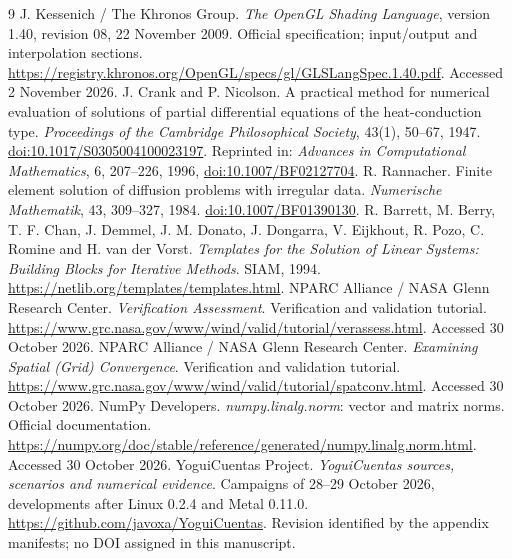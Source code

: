 \documentclass[11pt,a4paper]{article}
\newcommand{\repo}{\url{https://github.com/javoxa/YoguiCuentas}}
\begin{document}
\clearpage
\begin{thebibliography}{9}
 J. Kessenich / The Khronos Group. \emph{The OpenGL Shading Language}, version 1.40, revision 08, 22 November 2009. Official specification; input/output and interpolation sections. \url{https://registry.khronos.org/OpenGL/specs/gl/GLSLangSpec.1.40.pdf}. Accessed 2 November 2026.
 J. Crank and P. Nicolson. A practical method for numerical evaluation of solutions of partial differential equations of the heat-conduction type. \emph{Proceedings of the Cambridge Philosophical Society}, 43(1), 50--67, 1947. \href{https://doi.org/10.1017/S0305004100023197}{doi:10.1017/S0305004100023197}. Reprinted in: \emph{Advances in Computational Mathematics}, 6, 207--226, 1996, \href{https://doi.org/10.1007/BF02127704}{doi:10.1007/BF02127704}.
 R. Rannacher. Finite element solution of diffusion problems with irregular data. \emph{Numerische Mathematik}, 43, 309--327, 1984. \href{https://doi.org/10.1007/BF01390130}{doi:10.1007/BF01390130}.
 R. Barrett, M. Berry, T. F. Chan, J. Demmel, J. M. Donato, J. Dongarra, V. Eijkhout, R. Pozo, C. Romine and H. van der Vorst. \emph{Templates for the Solution of Linear Systems: Building Blocks for Iterative Methods}. SIAM, 1994. \url{https://netlib.org/templates/templates.html}.
 NPARC Alliance / NASA Glenn Research Center. \emph{Verification Assessment}. Verification and validation tutorial. \url{https://www.grc.nasa.gov/www/wind/valid/tutorial/verassess.html}. Accessed 30 October 2026.
 NPARC Alliance / NASA Glenn Research Center. \emph{Examining Spatial (Grid) Convergence}. Verification and validation tutorial. \url{https://www.grc.nasa.gov/www/wind/valid/tutorial/spatconv.html}. Accessed 30 October 2026.
 NumPy Developers. \emph{numpy.linalg.norm}: vector and matrix norms. Official documentation. \url{https://numpy.org/doc/stable/reference/generated/numpy.linalg.norm.html}. Accessed 30 October 2026.
 YoguiCuentas Project. \emph{YoguiCuentas sources, scenarios and numerical evidence}. Campaigns of 28--29 October 2026, developments after Linux 0.2.4 and Metal 0.11.0. \repo. Revision identified by the appendix manifests; no DOI assigned in this manuscript.
\end{thebibliography}
\end{document}

